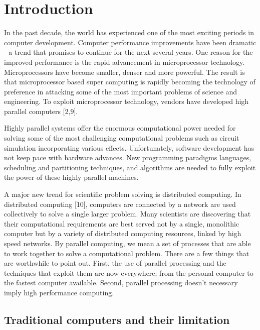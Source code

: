\chapter{Introduction}
In the past decade, the world has experienced one of the most exciting periods in computer development. Computer performance improvements have been dramatic
- a trend that promises to continue for the next several years. One reason for the improved performance is the rapid advancement in microprocessor technology.
Microprocessors have become smaller, denser and more powerful. The result is that microprocessor based super computing is rapidly becoming the technology of
preference in attacking some of the most important problems of science and engineering. To exploit microprocessor technology, vendors have developed high
parallel computers [2,9].\par
\hspace{1in}Highly parallel systems offer the enormous computational power needed for solving some of the most challenging computational problems such as
circuit simulation incorporating various effects. Unfortunately, software development has not keep pace with hardware advances. New programming paradigms
languages, scheduling and partitioning techniques, and algorithms are needed to fully exploit the power of these highly parallel machines.\par
\hspace{1in}A major new trend for scientific problem solving is distributed computing. In distributed computing [10], computers are connected by a network
are used collectively to solve a single larger problem. Many scientists are discovering that their computational requirements are best served not by a single,
monolithic computer but by a variety of distributed computing resources, linked by high speed networks. By parallel computing, we mean a set of processes that
are able to work together to solve a computational problem. There are a few things that are worthwhile to point out. First, the use of parallel processing and
the techniques that exploit them are now everywhere; from the personal computer to the fastest computer available. Second, parallel processing doesn't
necessary imply high performance computing.

\section{Traditional computers and their limitation}

